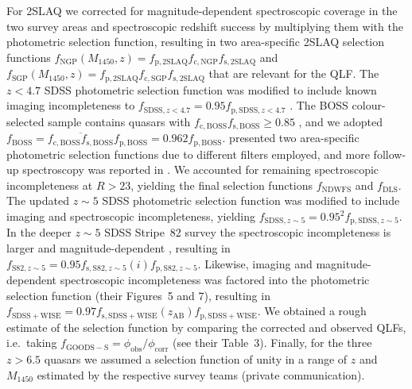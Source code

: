 \documentclass[fleqn,usenatbib]{mnras}
\begin{document}
For 2SLAQ we corrected for magnitude-dependent spectroscopic coverage
in the two survey areas \citep[$f_\mathrm{c,NGP}\left(g\right)$ and
  $f_\mathrm{c,SGP}\left(g\right)$; Figure~4
  in][]{2009MNRAS.392...19C} and spectroscopic redshift success
\citep[$f_\mathrm{s,2SLAQ}\left(g\right)$; Figure~6b
  in][]{2009MNRAS.392...19C} by multiplying them with the photometric
selection function, resulting in two area-specific 2SLAQ selection
functions
$f_\mathrm{NGP}\left(M_{1450},z\right)=f_\mathrm{p,2SLAQ}f_\mathrm{c,NGP}f_\mathrm{s,2SLAQ}$
and
$f_\mathrm{SGP}\left(M_{1450},z\right)=f_\mathrm{p,2SLAQ}f_\mathrm{c,SGP}f_\mathrm{s,2SLAQ}$
that are relevant for the QLF.  The $z<4.7$ SDSS photometric selection
function was modified to include known imaging incompleteness to
$f_{\mathrm{SDSS},z<4.7}=0.95f_{\mathrm{p,SDSS},z<4.7}$
\citep{2006AJ....131.2766R}. The BOSS colour-selected sample contains
quasars with $f_\mathrm{c,BOSS}f_\mathrm{s,BOSS}\ge 0.85$
\citep{2013ApJ...773...14R}, and we adopted
$f_\mathrm{BOSS}=\overline{f_\mathrm{c,BOSS}f_\mathrm{s,BOSS}}f_\mathrm{p,BOSS}=0.962f_\mathrm{p,BOSS}$. \citet{2010ApJ...710.1498G}
presented two area-specific photometric selection functions due to
different filters employed, and more follow-up spectroscopy was
reported in \citet{2011ApJ...728L..26G}. We accounted for remaining
spectroscopic incompleteness at $R>23$, yielding the final selection
functions $f_\mathrm{NDWFS}$ and $f_\mathrm{DLS}$. The updated $z\sim
5$ SDSS photometric selection function \citep{2013ApJ...768..105M} was
modified to include imaging and spectroscopic incompleteness, yielding
$f_{\mathrm{SDSS},z\sim 5}=0.95^2f_{\mathrm{p,SDSS},z\sim 5}$. In the
deeper $z\sim 5$ SDSS Stripe~82 survey the spectroscopic
incompleteness is larger and magnitude-dependent \citep[Figure~14
  in][]{2013ApJ...768..105M}, resulting in $f_{\mathrm{S82},z\sim
  5}=0.95f_{\mathrm{s,S82},z\sim
  5}\left(i\right)f_{\mathrm{p,S82},z\sim 5}$. Likewise, imaging and
magnitude-dependent spectroscopic incompleteness was factored into the
\citet{2016ApJ...829...33Y} photometric selection function (their
Figures~5 and 7), resulting in
$f_\mathrm{SDSS+WISE}=0.97f_\mathrm{s,SDSS+WISE}\left(z_\mathrm{AB}\right)f_\mathrm{p,SDSS+WISE}$.
We obtained a rough estimate of the \citet{2015AA...578A..83G}
selection function by comparing the corrected and observed QLFs,
i.e.\ taking $f_\mathrm{GOODS-S}=\phi_\mathrm{obs}/\phi_\mathrm{corr}$
(see their Table~3).  Finally, for the three $z>6.5$ quasars we
assumed a selection function of unity in a range of $z$ and $M_{1450}$
estimated by the respective survey teams (private communication).
\end{document}
